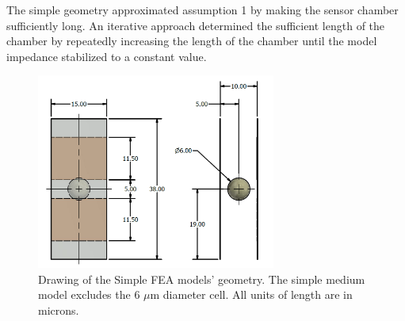 \par The simple geometry approximated assumption 1 by making the sensor chamber sufficiently long. An iterative approach determined the sufficient length of the chamber by repeatedly increasing the length of the chamber until the model impedance stabilized to a constant value. 

\begin{figure}[H]
    \centering
    \includegraphics[width=0.7\textwidth]{images/simple_cell_drawing_inventor.png}
    \caption[Simple FEA model geometry.]{Drawing of the Simple FEA models' geometry. The simple medium model excludes the 6 $\mu$m diameter cell. All units of length are in microns.}
    \label{fig:simple_model_geometry}
\end{figure}

